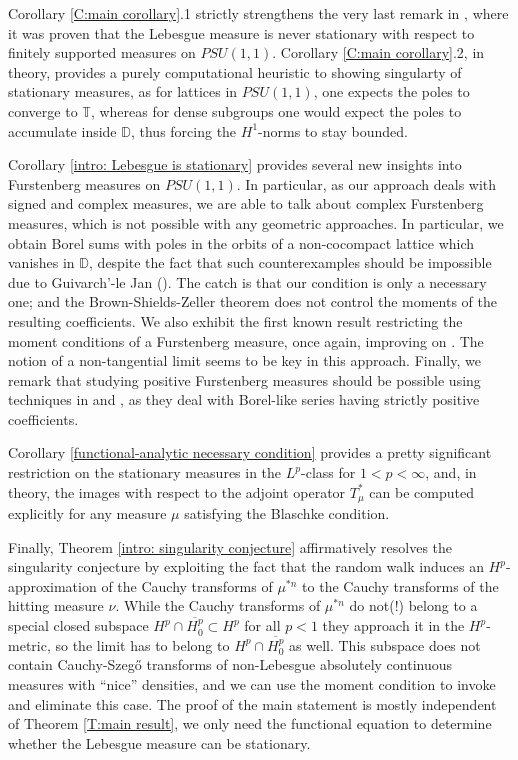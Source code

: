 \documentclass[11pt]{article}
\begin{document}
Corollary \ref{C:main corollary}.1 strictly strengthens the very last remark in \cite{Bourgain2012}, where it was proven that the Lebesgue measure is never stationary with respect to finitely supported measures on $PSU(1,1)$. Corollary \ref{C:main corollary}.2, in theory, provides a purely computational heuristic to showing singularty of stationary measures, as for lattices in $PSU(1,1)$, one expects the poles to converge to $\mathbb{T}$, whereas for dense subgroups one would expect the poles to accumulate inside $\mathbb{D}$, thus forcing the $H^1$-norms to stay bounded. 


Corollary \ref{intro: Lebesgue is stationary} provides several new insights into Furstenberg measures on $PSU(1,1)$. In particular, as our approach deals with signed and complex measures, we are able to talk about complex Furstenberg measures, which is not possible with any geometric approaches. In particular, we obtain Borel sums with poles in the orbits of a non-cocompact lattice which vanishes in $\mathbb{D}$, despite the fact that such counterexamples should be impossible due to Guivarch'-le Jan (\cite{guivarch1990}). The catch is that our condition is only a necessary one; and the Brown-Shields-Zeller theorem does not control the moments of the resulting coefficients. We also exhibit the first known result restricting the moment conditions of a Furstenberg measure, once again, improving on \cite{Bourgain2012}. The notion of a non-tangential limit seems to be key in this approach. Finally, we remark that studying positive Furstenberg measures should be possible using techniques in \cite{bonsall1989vanishing} and \cite{hayman1990bases}, as they deal with Borel-like series having strictly positive coefficients.

Corollary \ref{functional-analytic necessary condition} provides a pretty significant restriction on the stationary measures in the $L^p$-class for $1 < p < \infty$, and, in theory, the images with respect to the adjoint operator $T_\mu^*$ can be computed explicitly for any measure $\mu$ satisfying the Blaschke condition.

Finally, Theorem \ref{intro: singularity conjecture} affirmatively resolves the singularity conjecture by exploiting the fact that the random walk induces an $H^p$-approximation of the Cauchy transforms of $\mu^{*n}$ to the Cauchy transforms of the hitting measure $\nu$. While the Cauchy transforms of $\mu^{*n}$ do not(!) belong to a special closed subspace $H^p \cap \overline{H^p_0} \subset H^p$ for all $p < 1$ they approach it in the $H^p$-metric, so the limit has to belong to $H^p \cap \overline{H^p_0}$ as well. This subspace does not contain Cauchy-Szeg\H{o} transforms of non-Lebesgue absolutely continuous measures with ``nice'' densities, and we can use the moment condition to invoke \cite{blachere2011harmonic} and eliminate this case. The proof of the main statement is mostly independent of Theorem \ref{T:main result}, we only need the functional equation to determine whether the Lebesgue measure can be stationary.
\end{document}
